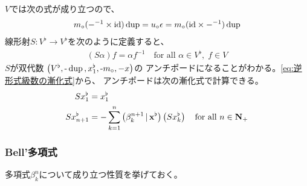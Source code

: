 {	$V$では次の式が成り立つので、
	\begin{equation*}\begin{split}
		m_\circ(-^{-1}\times\mathinner{\operatorname{id}})\mathinner{\operatorname{dup}} = u_\circ\epsilon 
		= m_\circ(\mathinner{\operatorname{id}}\times-^{-1})\mathinner{\operatorname{dup}}
	\end{split}\end{equation*}
	線形射$S:V^\flat\to V^\flat$を次のように定義すると、
	\begin{equation*}\begin{split}
		(S\alpha) f = \alpha f^{-1}
		\quad\text{for all } \alpha\in V^\flat,\; f\in V
	\end{split}\end{equation*}
	$S$が双代数
	$\gplr{V^\flat,\myhere\op{dup},x_1^\flat,\myhere m_\circ,-x}$の
	アンチポードになることがわかる。\eqref{eq:逆形式級数の漸化式}から、
	アンチポードは次の漸化式で計算できる。
	\begin{equation*}\begin{split}
		Sx_1^\flat &= x_1^\flat \\
		Sx_{n+1}^\flat &= -\sum_{k=1}^n 
		\mathinner{\bigl({\beta^{n+1}_k\,\vert\,\mathbf{x}^\flat}\bigr)} \mathinner{\bigl({Sx_k^\flat}\bigr)}
		\quad\text{for all } n\in\mathbf{N}_+
	\end{split}\end{equation*}
\subsubsection{Bell'多項式}\label{s3:Bell'多項式} %
	多項式$\beta^n_k$について成り立つ性質を挙げておく。

}
